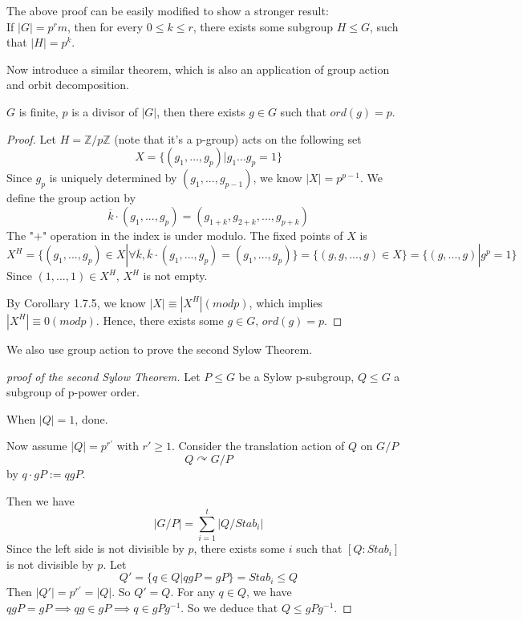 \documentclass[11pt,fleqn]{book} %
\begin{document}
\begin{CJK}{UTF8}{gkai}
\begin{remark}
	The above proof can be easily modified to show a stronger result:\\
	If $|G| = p^rm$, then for every $0 \leq k \leq r$, there exists some subgroup $H \leq G$, such that $|H| = p^k$.
\end{remark}

Now introduce a similar theorem, which is also an application of group action and orbit decomposition.
\begin{theorem}
	[A. L. Cauchy] $G$ is finite, $p$ is a divisor of $|G|$, then there exists $g \in G$ such that $ord(g) = p$.
\end{theorem}
\begin{proof}
	Let $H = \mathbb{Z}/p\mathbb{Z}$ (note that it's a p-group) acts on the following set
	\[X = \{(g_1,...,g_p) | g_1...g_p = 1\}\]
	Since $g_p$ is uniquely determined by $(g_1,...,g_{p-1})$, we know $|X| = p^{p-1}$.
	We define the group action by 
	\[\overline{k} \cdot (g_1,...,g_p) = (g_{1+k},g_{2+k},...,g_{p+k})\]
	The "$+$" operation in the index is under modulo.
	The fixed points of $X$ is 
	\[X^H = \{(g_1,...,g_p) \in X | \forall \overline{k}, \overline{k}\cdot (g_1,...,g_p) = (g_1,...,g_p)\}=\{(g,g,...,g)\in X\} = \{(g,...,g) | g^p = 1\} \]
	Since $(1,...,1) \in X^H$, $X^H$ is not empty.

	By Corollary 1.7.5, we know $|X| \equiv |X^H| (mod p)$, which implies $|X^H| \equiv 0 (mod p)$. Hence, there exists some $g \in G$, $ord(g) = p$.
\end{proof}

We also use group action to prove the second Sylow Theorem.
\begin{proof}
	[proof of the second Sylow Theorem] Let $P \leq G$ be a Sylow p-subgroup, $Q \leq G$ a subgroup of p-power order. 

	When $|Q| = 1$, done.

	Now assume $|Q| = p^{r'}$ with $r' \geq 1$. Consider the translation action of $Q$ on $G/P$
	\[Q\curvearrowright G/P\]
	by $q\cdot gP := qgP$.

	Then we have 
	\[|G/P| = \sum_{i=1}^t |Q/Stab_i|\]
	Since the left side is not divisible by $p$, there exists some $i$ such that $[Q : Stab_i]$ is not divisible by $p$. Let 
	\[Q' = \{q\in Q | qgP = gP\} = Stab_i \leq Q\]
	Then $|Q'| = p^{r'} = |Q|$. So $Q' = Q$. For any $q \in Q$, we have $qgP = gP \implies qg \in gP \implies q \in gPg^{-1}$.
	So we deduce that $Q \leq gPg^{-1}$. 
\end{proof}


\end{CJK}
\end{document}
